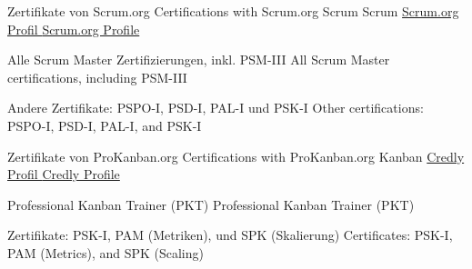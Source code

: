 {
}


\begin{cventries}

	\cventry
	{
			{ Zertifikate von Scrum.org }
			{ Certifications with Scrum.org }
	} %
	{
			{ Scrum }
			{ Scrum }
	} %
	{
		\href{https://www.scrum.org/user/601291}{
				{ Scrum.org Profil }
				{ Scrum.org Profile }
		}
	} %
	{
	} %
	{
		\begin{cvitems} %
			\item {
					{ Alle Scrum Master Zertifizierungen, inkl. PSM-III }
					{ All Scrum Master certifications, including PSM-III }
			}
			\item {
					{ Andere Zertifikate: PSPO-I, PSD-I, PAL-I und PSK-I }
					{ Other certifications: PSPO-I, PSD-I, PAL-I, and PSK-I }
			}		
		\end{cvitems}
	}
	
	\cventry
	{ 	}
	{  	}
	{  	}
	{  	}
	{  	}
	
  	\cventry
  	{  		
  			{ Zertifikate von ProKanban.org }
  			{ Certifications with ProKanban.org }
  	} %
  	{
  		Kanban
  	} %
  	{
  		\href{https://www.credly.com/users/benjamin-huser}{
				{ Credly Profil }
				{ Credly Profile }
		}
  	} %
  	{
  	} %
  	{
  		\begin{cvitems} %
  			\item {
  				{ Professional Kanban Trainer (PKT) }
  				{ Professional Kanban Trainer (PKT) }
  			}
  			\item {
  					{ Zertifikate: PSK-I, PAM (Metriken), und SPK (Skalierung) }
  					{ Certificates: PSK-I, PAM (Metrics), and SPK (Scaling) }
  			}
  		\end{cvitems}
  	}
  	
  	\cventry
  	{ 	}
  	{  	}
  	{  	}
  	{  	}
  	{  	}
\end{cventries}
